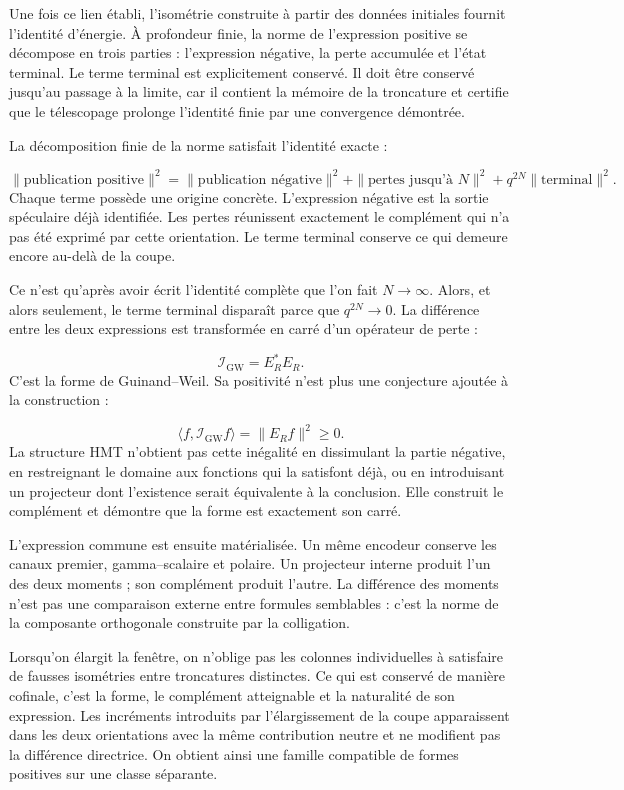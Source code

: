 Une fois ce lien établi, l’isométrie construite à partir des données initiales fournit l’identité d’énergie. À profondeur finie, la norme de l’expression positive se décompose en trois parties : l’expression négative, la perte accumulée et l’état terminal. Le terme terminal est explicitement conservé. Il doit être conservé jusqu’au passage à la limite, car il contient la mémoire de la troncature et certifie que le télescopage prolonge l’identité finie par une convergence démontrée.\par
La décomposition finie de la norme satisfait l’identité exacte :\par
\[
\|\text{publication positive}\|^2
=
\|\text{publication négative}\|^2
+
\|\text{pertes jusqu'à }N\|^2
+
q^{2N}\|\text{terminal}\|^2.
\]
Chaque terme possède une origine concrète. L’expression négative est la sortie spéculaire déjà identifiée. Les pertes réunissent exactement le complément qui n’a pas été exprimé par cette orientation. Le terme terminal conserve ce qui demeure encore au-delà de la coupe.\par
Ce n’est qu’après avoir écrit l’identité complète que l’on fait \(N\to\infty\). Alors, et alors seulement, le terme terminal disparaît parce que \(q^{2N}\to0\). La différence entre les deux expressions est transformée en carré d’un opérateur de perte :\par
\[
\mathcal I_{\mathrm{GW}}
=
E_R^{*}E_R.
\]
C’est la forme de Guinand–Weil. Sa positivité n’est plus une conjecture ajoutée à la construction :\par
\[
\langle f,\mathcal I_{\mathrm{GW}}f\rangle
=
\|E_Rf\|^2
\ge0.
\]
La structure HMT n’obtient pas cette inégalité en dissimulant la partie négative, en restreignant le domaine aux fonctions qui la satisfont déjà, ou en introduisant un projecteur dont l’existence serait équivalente à la conclusion. Elle construit le complément et démontre que la forme est exactement son carré.\par
L’expression commune est ensuite matérialisée. Un même encodeur conserve les canaux premier, gamma–scalaire et polaire. Un projecteur interne produit l’un des deux moments ; son complément produit l’autre. La différence des moments n’est pas une comparaison externe entre formules semblables : c’est la norme de la composante orthogonale construite par la colligation.\par
Lorsqu’on élargit la fenêtre, on n’oblige pas les colonnes individuelles à satisfaire de fausses isométries entre troncatures distinctes. Ce qui est conservé de manière cofinale, c’est la forme, le complément atteignable et la naturalité de son expression. Les incréments introduits par l’élargissement de la coupe apparaissent dans les deux orientations avec la même contribution neutre et ne modifient pas la différence directrice. On obtient ainsi une famille compatible de formes positives sur une classe séparante.\par
